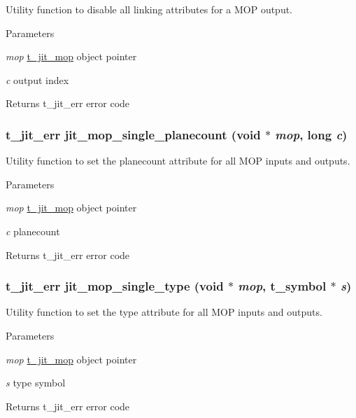 Utility function to disable all linking attributes for a MOP output. 
\begin{DoxyParams}{Parameters}
\item[{\em mop}]\hyperlink{structt__jit__mop}{t\_\-jit\_\-mop} object pointer \item[{\em c}]output index\end{DoxyParams}
\begin{DoxyReturn}{Returns}
t\_\-jit\_\-err error code 
\end{DoxyReturn}
\hypertarget{group__mopmod_gada02eaa2a5dc001cdb120a83cb093e25}{
\subsubsection[{jit\_\-mop\_\-single\_\-planecount}]{\setlength{\rightskip}{0pt plus 5cm}t\_\-jit\_\-err jit\_\-mop\_\-single\_\-planecount (void $\ast$ {\em mop}, \/  long {\em c})}}
\label{group__mopmod_gada02eaa2a5dc001cdb120a83cb093e25}


Utility function to set the planecount attribute for all MOP inputs and outputs. 
\begin{DoxyParams}{Parameters}
\item[{\em mop}]\hyperlink{structt__jit__mop}{t\_\-jit\_\-mop} object pointer \item[{\em c}]planecount\end{DoxyParams}
\begin{DoxyReturn}{Returns}
t\_\-jit\_\-err error code 
\end{DoxyReturn}
\hypertarget{group__mopmod_ga8923e590eaf3cdb7d92c7f982ddc169f}{
\subsubsection[{jit\_\-mop\_\-single\_\-type}]{\setlength{\rightskip}{0pt plus 5cm}t\_\-jit\_\-err jit\_\-mop\_\-single\_\-type (void $\ast$ {\em mop}, \/  {\bf t\_\-symbol} $\ast$ {\em s})}}
\label{group__mopmod_ga8923e590eaf3cdb7d92c7f982ddc169f}


Utility function to set the type attribute for all MOP inputs and outputs. 
\begin{DoxyParams}{Parameters}
\item[{\em mop}]\hyperlink{structt__jit__mop}{t\_\-jit\_\-mop} object pointer \item[{\em s}]type symbol\end{DoxyParams}
\begin{DoxyReturn}{Returns}
t\_\-jit\_\-err error code 
\end{DoxyReturn}
